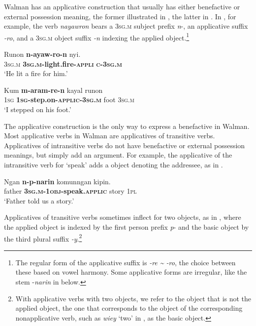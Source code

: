 \documentclass[output=paper]{langscibook}
\begin{document}
 Walman has an applicative construction that usually has either benefactive or external possession meaning, the former illustrated in , the latter in . In , for example, the verb \emph{nayawron} bears a \textsc{3sg.m} subject prefix \emph{n}{}-, an applicative suffix \emph{{}-ro}, and a \textsc{3sg.m} object suffix\emph{ -n} indexing the applied object.\footnote{ The regular form of the applicative suffix is \emph{-re {\textasciitilde} -ro}, the choice between these based on vowel harmony. Some applicative forms are irregular, like the stem -\emph{narin} in  below.}


\ea%
    \label{ex:Brown:4}
    \gll Runon  \textbf{n-ayaw-ro-n}  nyi.\\
       \textsc{3sg.m}  \textbf{\textsc{3sg.m-}}\textbf{light.fire\textsc{{}-appli}} \textbf{\textsc{c-3sg.m}}  \\
    \glt ‘He lit a fire for him.’
    \z

          
  

\ea%
    \label{ex:Brown:5}
    \gll Kum  \textbf{m-aram-re-n}  kayal  runon\\
        \textsc{1sg}  \textbf{\textsc{1sg}}\textbf{{}-step.on-}\textbf{\textsc{applic}}\textbf{{}-}\textbf{\textsc{3sg.m}}  foot  \textsc{3sg.m}\\
    \glt  ‘I stepped on his foot.’
    \z

The applicative construction is the only way to express a benefactive in Walman. Most applicative verbs in Walman are applicatives of transitive verbs. Applicatives of intransitive verbs do not have benefactive or external possession meanings, but simply add an argument. For example, the applicative of the intransitive verb for ‘speak’ adds a object denoting the addressee, as in .

\ea%
    \label{ex:Brown:6}
    \gll Ngan  \textbf{n-p-narin}  komunngan  kipin.\\
         father  \textbf{\textsc{3sg.m-1obj-}}\textbf{speak.\textsc{applic}}  story  \textsc{1pl}\\
    \glt  ‘Father told us a story.’
    \z
    
Applicatives of transitive verbs sometimes inflect for two objects, as in , where the applied object is indexed by the first person prefix\emph{ p}{}- and the basic object by the third plural suffix \emph{{}-y}.\footnote{ With applicative verbs with two objects, we refer to the object that is not the applied object, the one that corresponds to the object of the corresponding nonapplicative verb, such as \emph{wiey} ‘two’ in , as the basic object.} 
\end{document}
